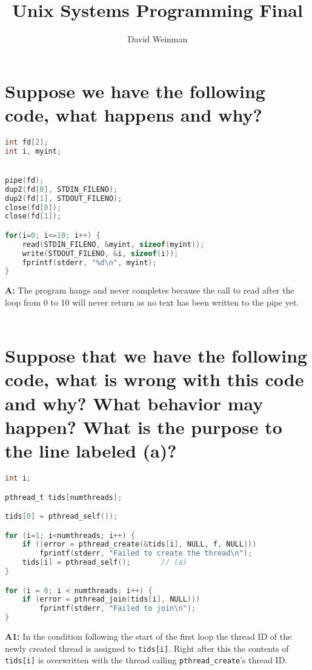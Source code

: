 \documentclass{article}
\title{Unix Systems Programming Final}
\author{David Weinman}
\begin{document}
\maketitle

\section{Suppose we have the following code, what happens and why?}
\begin{lstlisting}[language=C, basicstyle=\ttfamily\footnotesize, showstringspaces=false, stringstyle=\color{Salmon}, commentstyle=\itshape\color{magenta},  keywordstyle=\color{Bittersweet}]
int fd[2];
int i, myint;


pipe(fd);
dup2(fd[0], STDIN_FILENO);
dup2(fd[1], STDOUT_FILENO);
close(fd[0]);
close(fd[1]);

for(i=0; i<=10; i++) {
	read(STDIN_FILENO, &myint, sizeof(myint));
	write(STDOUT_FILENO, &i, sizeof(i));
	fprintf(stderr, "%d\n", myint);
}
\end{lstlisting}
\textbf{A:} The program hangs and never completes because the call to read after the loop from 0 to 10 will never return as no text has been written to the pipe yet. \\
\\
\section{Suppose that we have the following code, what is wrong with this code and why? What behavior may happen? What is the purpose to the line labeled (a)?}
\begin{lstlisting}[language=C, basicstyle=\ttfamily\footnotesize, showstringspaces=false, stringstyle=\color{Salmon}, commentstyle=\itshape\color{magenta},  keywordstyle=\color{Bittersweet}]
int i;

pthread_t tids[numthreads];

tids[0] = pthread_self());

for (i=1; i<numthreads; i++) {
	if ((error = pthread_create(&tids[i], NULL, f, NULL)))
		fprintf(stderr, "Failed to create the thread\n");
	tids[i] = pthread_self();		// (a)
}

for (i = 0; i < numthreads; i++) {
	if (error = pthread_join(tids[i], NULL)))
		fprintf(stderr, "Failed to join\n");
}
\end{lstlisting}
\textbf{A1:} In the condition following the start of the first loop the thread ID of the newly created thread is assigned to \texttt{tids[i]}. Right after this the contents of \texttt{tids[i]} is overwritten with the thread calling \texttt{pthread\_create}'s thread ID.
\end{document}
